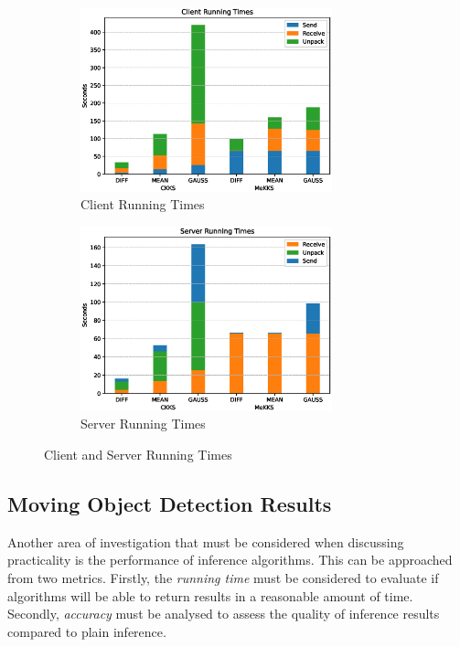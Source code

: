\begin{figure}[h!]
    \centering
    \begin{subfigure}[t]{0.495\textwidth}
        \centering
        \includegraphics[width=0.8\textwidth]{figures/clientTimes}
        \caption{Client Running Times}
        \label{fig:clientTimeGraph}
    \end{subfigure}
    \hfill
    \begin{subfigure}[t]{0.495\textwidth}
        \centering
        \includegraphics[width=0.8\textwidth]{figures/serverTimes}
        \caption{Server Running Times}
        \label{fig:serverTimeGraph}
    \end{subfigure}
    \caption{Client and Server Running Times}
    \label{fig:clientAndServerGraph}
\end{figure}


\subsection{Moving Object Detection Results}
\indent \indent
Another area of investigation that must be considered when discussing practicality is the performance of inference algorithms. This can be approached from two metrics. Firstly, the \textit{running time} must be considered to evaluate if algorithms will be able to return results in a reasonable amount of time. Secondly, \textit{accuracy} must be analysed to assess the quality of inference results compared to plain inference.

